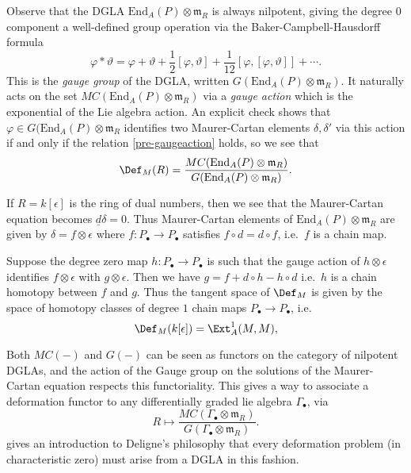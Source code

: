 Observe that the DGLA \(\text{End}_A(P)\otimes \mathfrak{m}_R\) is
always nilpotent, giving the degree \(0\) component
a well-defined group operation via the Baker-Campbell-Hausdorff formula 
\[\varphi \ast \vartheta = \varphi + \vartheta
+ \frac{1}{2}[\varphi, \vartheta]+\frac{1}{12}[\varphi,
[\varphi, \vartheta]]+\cdots.\] 
This is the \textit{gauge group} of the DGLA, written
\(G(\text{End}_A(P)\otimes\mathfrak{m}_R)\). It naturally acts on the set
\(MC(\text{End}_A(P)\otimes \mathfrak{m}_R)\) via a \textit{gauge action} which
is the exponential of the Lie algebra action. An explicit check shows that
\(\varphi\in G(\text{End}_A(P)\otimes \mathfrak{m}_R\) identifies two
Maurer-Cartan elements \(\delta,\delta'\) via this action if and only if the
relation \eqref{pre-gaugeaction} holds, so we see that
\[\Def_M(R) = \frac{MC(\text{End}_A(P)\otimes\mathfrak{m}_R)}
{G(\text{End}_A(P)\otimes\mathfrak{m}_R)}.\]

\begin{example}
    If \(R=k[\epsilon]\) is the ring of dual numbers, then we see that the
    Maurer-Cartan equation becomes \(\underline{d}\delta = 0\). Thus Maurer-Cartan elements
    of \(\text{End}_A(P)\otimes \mathfrak{m}_R\) are given by \(\delta = f \otimes
    \epsilon\) where \(f: P_\bullet\rightarrow P_\bullet\) satisfies 
    \(f\circ d = d\circ f\), i.e.\ \(f\) is a chain map.

    Suppose the degree zero map \(h:P_\bullet\rightarrow P_\bullet\) is such
    that the gauge action of \(h \otimes \epsilon \) identifies \(f\otimes
    \epsilon\) with \(g \otimes \epsilon\). Then we have 
    \(g = f + d \circ h- h \circ d\) i.e.\ \(h\) is a chain homotopy between
    \(f\) and \(g\). Thus the tangent space of \(\Def_M\) is given by the space
    of homotopy classes of degree \(1\) chain maps \(P_\bullet \rightarrow
    P_\bullet\), i.e.\
    \[\Def_M(k[\epsilon]) = \Ext^1_A(M,M),\]
    \end{example}

\begin{remark}
    Both \(MC(-)\) and \(G(-)\) can be seen as functors on the category of
    nilpotent DGLAs, and the action of the Gauge group on the solutions of the
    Maurer-Cartan equation respects this functoriality. This gives a way to
    associate a deformation functor to any differentially graded lie algebra
    \(\Gamma_\bullet\), via 
    \[R\mapsto \frac{MC(\Gamma_\bullet\otimes
    \mathfrak{m}_R)}{G(\Gamma_\bullet\otimes \mathfrak{m}_R)}.\]
    \cite{szendroi_unbearable_1999} gives an introduction to Deligne's philosophy that
    every deformation problem (in characteristic zero) must arise from a DGLA in
    this fashion. 
\end{remark}

